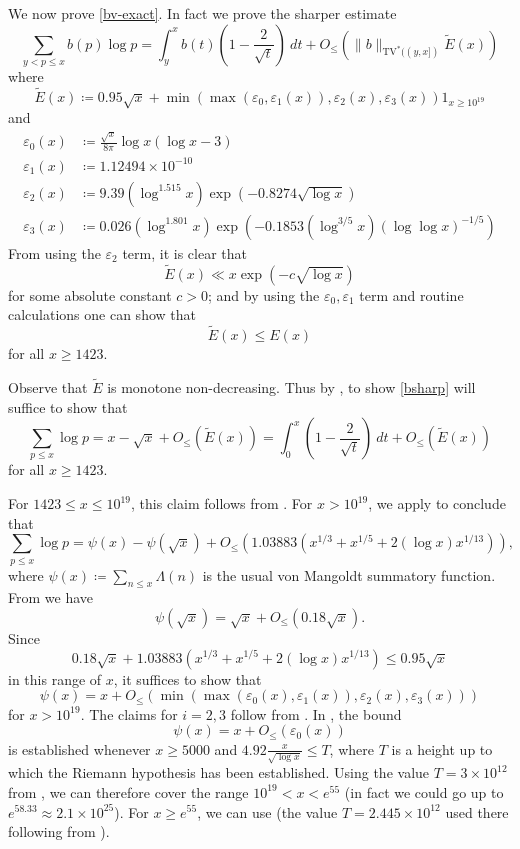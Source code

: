 \documentclass[12pt,a4paper,reqno]{amsart}
\numberwithin{equation}{section}
\theoremstyle{plain}
\theoremstyle{definition}
\newcommand\eps{\varepsilon}
\begin{document}
We now prove \eqref{bv-exact}. In fact we prove the sharper estimate
\begin{equation}\label{bsharp}  
  \sum_{y < p \leq x} b(p) \log p = \int_y^x b(t) (1 - \frac{2}{\sqrt{t}}) \ dt
+ O_\leq\left(\|b\|_{\mathrm{TV}^*((y,x])} \tilde E(x) \right)
\end{equation}
where
\begin{equation}\label{etil-def}
\tilde E(x) \coloneqq 0.95 \sqrt{x} + \min( \max(\eps_0,\eps_1(x)), \eps_2(x), \eps_3(x)) 1_{x \geq 10^{19}}
\end{equation}
and
\begin{align*}
  \eps_0(x) &\coloneqq \frac{\sqrt{x}}{8\pi} \log x(\log x - 3)\\
  \eps_1(x) &\coloneqq 1.12494 \times 10^{-10}\\
  \eps_2(x) &\coloneqq 9.39 (\log^{1.515} x) \exp(-0.8274\sqrt{\log x})\\
  \eps_3(x) &\coloneqq 0.026 (\log^{1.801} x) \exp(-0.1853 (\log^{3/5} x) (\log\log x)^{-1/5})
\end{align*}
From using the $\eps_2$ term, it is clear that
$$ \tilde E(x) \ll x \exp(-c \sqrt{\log x})$$
for some absolute constant $c>0$; and by using the $\eps_0, \eps_1$ term and routine calculations one can show that 
$$ \tilde E(x) \leq E(x)$$
for all $x \geq 1423$.

Observe that $\tilde E$ is monotone non-decreasing. Thus by , to show \eqref{bsharp} will suffice to show that
$$ \sum_{p \leq x} \log p = x - \sqrt{x} + O_{\leq}(\tilde E(x))
  = \int_0^x \left(1-\frac{2}{\sqrt{t}}\right)\ dt + O_{\leq}(\tilde E(x))$$
for all $x \geq 1423$.

For $1423 \leq x \leq 10^{19}$, this claim follows from \cite[Theorem 2]{buthe-2}.  For $x > 10^{19}$, we apply \cite[(6.10), (6.11)]{buthe} to conclude that
$$
\sum_{p \leq x} \log p = \psi(x) - \psi(\sqrt{x}) + O_{\leq}(1.03883 (x^{1/3} + x^{1/5} + 2 (\log x) x^{1/13})),$$
where $\psi(x) \coloneqq \sum_{n \leq x} 
\Lambda(n)$ is the usual von Mangoldt summatory function.  
From \cite[Theorems 10,12]{rs} we have
$$ \psi(\sqrt{x}) = \sqrt{x} + O_{\leq}(0.18 \sqrt{x}).$$
Since
$$ 0.18 \sqrt{x} + 1.03883 (x^{1/3} + x^{1/5} + 2 (\log x) x^{1/13}) \leq 0.95 \sqrt{x}$$
in this range of $x$, it suffices to show that
$$ \psi(x) = x + O_{\leq}(\min( \max(\eps_0(x),\eps_1(x)), \eps_2(x), \eps_3(x)) )$$
for $x > 10^{19}$.  The claims for $i=2,3$ follow from \cite[Theorems 1.1, 1.4]{johnston-yang}.  In \cite[Theorem 2, (7.3)]{buthe}, the bound
$$ \psi(x) = x + O_{\leq}(\eps_0(x))$$
is established whenever $x \geq 5000$ and $4.92 \frac{x}{\sqrt{\log x}} \leq T$, where $T$ is a height up to which the Riemann hypothesis has been established.  Using the value $T = 3 \times 10^{12}$ from \cite{platt-rh}, we can therefore cover the range $10^{19} < x < e^{55}$ (in fact we could go up to $e^{58.33} \approx 2.1 \times 10^{25}$).  For $x \geq e^{55}$, we can use \cite[Table 2]{buthe} (the value $T = 2.445 \times 10^{12}$ used there following from \cite{platt-rh}).
\end{document}
